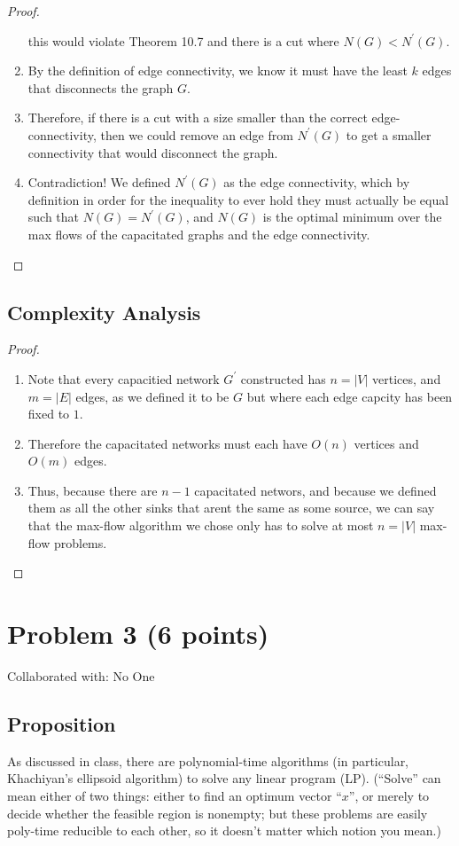 \documentclass{article}
\begin{document}
\begin{proof}
\begin{enumerate}
      this would violate Theorem 10.7 and there is a cut where \(N(G) < N^\prime (G)\).
      \item By the definition of edge connectivity, we know it must have the least \(k\)
      edges that disconnects the graph \(G\). 
      \item Therefore, if there is a cut with a size smaller than the correct
      edge-connectivity, then we could remove an edge from \(N^\prime (G)\) to get a
      smaller connectivity that would disconnect the graph. 
      \item Contradiction! We defined \(N^\prime (G)\) as the edge connectivity, which by
      definition in order for the inequality to ever hold they must actually be equal such
      that \(N(G) = N^\prime (G)\), and \(N(G)\) is the optimal minimum over the max flows
      of the capacitated graphs and the edge connectivity. 
\end{enumerate}
\end{proof}

\subsection{Complexity Analysis}
\begin{proof}
\begin{enumerate}
      \item Note that every capacitied network \(G^{\prime}\) constructed has \(n = |V|\)
      vertices, and \(m=|E|\) edges, as we defined it to be \(G\) but where each edge
      capcity has been fixed to \(1\). 
      \item Therefore the capacitated networks must each have \(O(n)\) vertices and
      \(O(m)\) edges. 
      \item Thus, because there are \(n-1\) capacitated networs, and because we defined them
      as all the other sinks that arent the same as some source, we can say that the
      max-flow algorithm we chose only has to solve at most \(n= |V|\) max-flow problems.  
\end{enumerate}
\end{proof}

\newpage
\section{Problem 3 (6 points)}
Collaborated with: No One

\subsection{Proposition}
As discussed in class, there are polynomial-time algorithms (in particular, Khachiyan's
ellipsoid algorithm) to solve any linear program (LP). (``Solve'' can mean either of two
things: either to find an optimum vector ``\(x\)'', or merely to decide whether the
feasible region is nonempty; but these problems are easily poly-time reducible to each
other, so it doesn't matter which notion you mean.)
\end{document}
